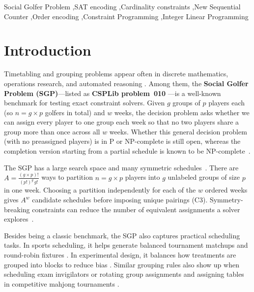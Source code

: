 \documentclass[a4paper,fleqn]{cas-sc}
\begin{document}
\begin{keywords}
Social Golfer Problem \sep SAT encoding \sep Cardinality constraints \sep New Sequential Counter \sep Order encoding \sep Constraint Programming \sep Integer Linear Programming
\end{keywords}

\maketitle

\section{Introduction}
\label{sec:introduction}

Timetabling and grouping problems appear often in discrete mathematics, operations research, and automated reasoning \cite{colbourn2006handbook,biere2021handbook}. Among them, the \textbf{Social Golfer Problem (SGP)}---listed as \textbf{CSPLib problem~010} \cite{harvey2001csplib}---is a well-known benchmark for testing exact constraint solvers. Given $g$ groups of $p$ players each (so $n = g \times p$ golfers in total) and $w$ weeks, the decision problem asks whether we can assign every player to one group each week so that no two players share a group more than once across all $w$ weeks. Whether this general decision problem (with no preassigned players) is in P or NP-complete is still open, whereas the completion version starting from a partial schedule is known to be NP-complete~\cite{triska2012tme,verplancke2026}.

The SGP has a large search space and many symmetric schedules~\cite{harvey2005molr,triska2012tme}.
There are $A = \frac{(g \times p)!}{(p!)^g\,g!}$ ways to partition
$n = g \times p$ players into $g$ unlabeled groups of size $p$ in one week.
Choosing a partition independently for each of the $w$ ordered weeks gives
$A^w$ candidate schedules before imposing unique pairings (C3).
Symmetry-breaking constraints can reduce the number of equivalent assignments
a solver explores~\cite{walsh2006symmetry}.

Besides being a classic benchmark, the SGP also captures practical scheduling tasks. In sports scheduling, it helps generate balanced tournament matchups and round-robin fixtures \cite{briskorn2008sports,henz2001basketball}. In experimental design, it balances how treatments are grouped into blocks to reduce bias \cite{colbourn2006handbook,stinson2004designs,montgomery2017design}. Similar grouping rules also show up when scheduling exam invigilators or rotating group assignments \cite{verplancke2026,triska2012tme} and assigning tables in competitive mahjong tournaments \cite{lester2021mahjong}.
\end{document}
